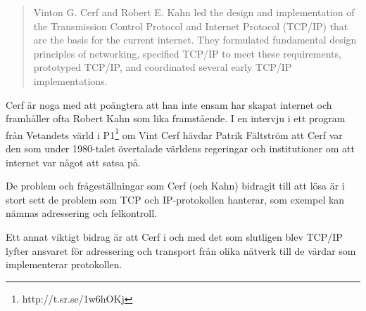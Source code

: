 \documentclass[10pt, titlepage, oneside, a4paper]{article}
\begin{document}
\begin{quotation}
Vinton G. Cerf and Robert E. Kahn led the design and implementation of the Transmission Control Protocol and Internet Protocol (TCP/IP) that are the basis for the current internet. They formulated fundamental design principles of networking, specified TCP/IP to meet these requirements, prototyped TCP/IP, and coordinated several early TCP/IP implementations.
\end{quotation}

Cerf är noga med att poängtera att han inte ensam har skapat internet och framhåller ofta Robert Kahn som lika framstående. I en intervju i ett program från Vetandets värld i P1\footnote{http://t.sr.se/1w6hOKj} om Vint Cerf hävdar Patrik Fältström att Cerf var den som under 1980-talet övertalade världens regeringar och institutioner om att internet var något att satsa på.

\vspace{7mm}


De problem och frågeställningar som Cerf (och Kahn) bidragit till att lösa är i stort sett de problem som TCP och IP-protokollen hanterar, som exempel kan nämnas adressering och felkontroll.

Ett annat viktigt bidrag är att Cerf i och med det som slutligen blev TCP/IP lyfter ansvaret för adressering och transport från olika nätverk till de värdar som implementerar protokollen.
 
\end{document}
